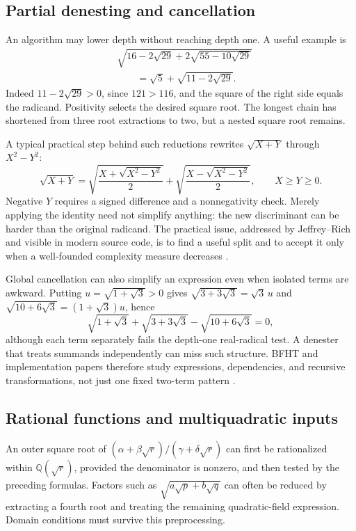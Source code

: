 \documentclass[11pt,oneside]{article}
\numberwithin{equation}{section}
\theoremstyle{definition}
\theoremstyle{remark}
\newcommand{\Q}{\mathbb{Q}}
\begin{document}
\subsection{Partial denesting and cancellation}
An algorithm may lower depth without reaching depth one. A useful example is
\begin{equation}\label{eq:partial}
\begin{split}
&\sqrt{16-2\sqrt{29}+2\sqrt{55-10\sqrt{29}}}\\
&\hspace{2em}=\sqrt5+\sqrt{11-2\sqrt{29}}.
\end{split}
\end{equation}
Indeed $11-2\sqrt{29}>0$, since $121>116$, and the square of the right side equals the radicand. Positivity selects the desired square root. The longest chain has shortened from three root extractions to two, but a nested square root remains.

A typical practical step behind such reductions rewrites $\sqrt{X+Y}$ through $X^2-Y^2$:
\begin{equation}\label{eq:recursive}
\sqrt{X+Y}
=\sqrt{\frac{X+\sqrt{X^2-Y^2}}2}
+\sqrt{\frac{X-\sqrt{X^2-Y^2}}2},
\qquad X\ge Y\ge0.
\end{equation}
Negative $Y$ requires a signed difference and a nonnegativity check. Merely applying the identity need not simplify anything: the new discriminant can be harder than the original radicand. The practical issue, addressed by Jeffrey--Rich and visible in modern source code, is to find a useful split and to accept it only when a well-founded complexity measure decreases \cite{jeffrey,sympysource,maxima}.

Global cancellation can also simplify an expression even when isolated terms are awkward. Putting $u=\sqrt{1+\sqrt3}>0$ gives $\sqrt{3+3\sqrt3}=\sqrt3\,u$ and $\sqrt{10+6\sqrt3}=(1+\sqrt3)u$, hence
\begin{equation}\label{eq:cancel}
\sqrt{1+\sqrt3}+\sqrt{3+3\sqrt3}-\sqrt{10+6\sqrt3}=0,
\end{equation}
although each term separately fails the depth-one real-radical test. A denester that treats summands independently can miss such structure. BFHT and implementation papers therefore study expressions, dependencies, and recursive transformations, not just one fixed two-term pattern \cite{bfht,jeffrey,blomerthesis}.

\subsection{Rational functions and multiquadratic inputs}
An outer square root of $(\alpha+\beta\sqrt r)/(\gamma+\delta\sqrt r)$ can first be rationalized within $\Q(\sqrt r)$, provided the denominator is nonzero, and then tested by the preceding formulas. Factors such as $\sqrt{a\sqrt p+b\sqrt q}$ can often be reduced by extracting a fourth root and treating the remaining quadratic-field expression. Domain conditions must survive this preprocessing.
\end{document}
